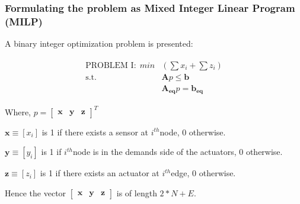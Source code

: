 \documentclass[authoryear,preprint,review,12pt]{elsarticle}
\begin{document}
\subsubsection*{Formulating the problem as  Mixed Integer Linear Program (MILP)}
A binary integer optimization problem is presented:

\begin{eqnarray}
\begin{aligned}
\text{PROBLEM I:}~~ min & (\sum x_{i}+\sum z_{i})\\
\text{s.t.}~& \mathbf{A}
p
 \leq \mathbf{b}\\
& \mathbf{A_{eq}}p =  \mathbf{b_{eq}}
\end{aligned}
\end{eqnarray}



Where, $  p=\begin{bmatrix}
 \mathbf{x} & \mathbf{y} & \mathbf{z} \end{bmatrix}^{T}$

$\mathbf{x}\equiv[x_{i}]$ is 1 if there exists a sensor at
$i^{th}$node, 0 otherwise.

$\mathbf{y}\equiv[y_{i}]$ is 1 if $i^{th}$node is in the demands
side of the actuators, 0 otherwise.

$\mathbf{z}\equiv[z_{i}]$ is 1 if there exists an actuator at $i^{th}$edge,
0 otherwise.

Hence the vector $\left[\mathbf{\begin{array}{ccc}
\mathbf{x} & \mathbf{y} & \mathbf{z}\end{array}}\right]$ is of length $2*N+E$.
\end{document}
